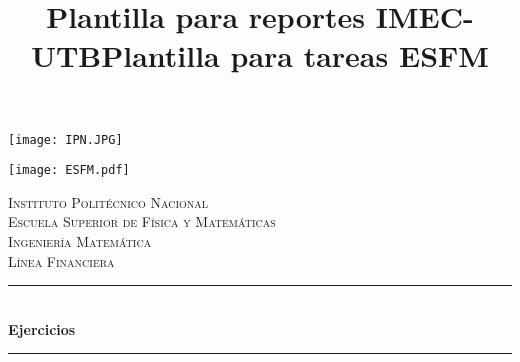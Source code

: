 \documentclass[10pt]{article}\usepackage[]{graphicx}\usepackage[]{color}
\title{Plantilla para reportes IMEC-UTB}
\title{Plantilla para tareas ESFM}
\begin{document}
\begin{center}																		%
\newcommand{\HRule}{\rule{\linewidth}{0.5mm}}									%
\begin{minipage}{0.48\textwidth} \begin{flushleft}
\texttt{[image: IPN.JPG]}
\end{flushleft}\end{minipage}
\begin{minipage}{0.48\textwidth} \begin{flushright}
\texttt{[image: ESFM.pdf]}
\end{flushright}\end{minipage}

\vspace*{1.0cm}								%
\textsc{\huge Instituto Politécnico Nacional \\ \vspace{5px} Escuela Superior de Física y Matemáticas}\\[1.5cm]	

\textsc{\LARGE  Ingeniería Matemática \\ \vspace{5px} Línea Financiera }\\[1.5cm]													%


 			\vspace*{1cm}																		%
\HRule \\[0.4cm]																	%
{ \huge \bfseries Ejercicios}\\[0.4cm]	%
\HRule \\[1 cm]																	%
\begin{minipage}{0.46\textwidth}													%
\begin{flushleft} \large															%


\end{flushleft}
\end{minipage}
\end{center}
\end{document}
